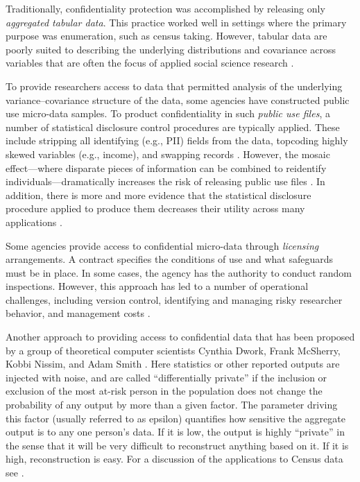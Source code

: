 \documentclass[]{krantz}
\begin{document}
Traditionally, confidentiality protection was accomplished by releasing
only \emph{aggregated tabular data}. This practice worked well in
settings where the primary purpose was enumeration, such as census
taking. However, tabular data are poorly suited to describing the
underlying distributions and covariance across variables that are often
the focus of applied social science research \citep{duncanstatistical}.

To provide researchers access to data that permitted analysis of the
underlying variance--covariance structure of the data, some agencies
have constructed public use micro-data samples. To product
confidentiality in such \emph{public use files}, a number of statistical
disclosure control procedures are typically applied. These include
stripping all identifying (e.g., PII) fields from the data, topcoding
highly skewed variables (e.g., income), and swapping records
\citep{doyle2001confidentiality, zayatz2007disclosure}. However, the
mosaic effect---where disparate pieces of information can be combined to
reidentify individuals---dramatically increases the risk of releasing
public use files \citep{czajka2014minimizing}. In addition, there is
more and more evidence that the statistical disclosure procedure applied
to produce them decreases their utility across many applications
\citep{burkhauser2010improving}.

Some agencies provide access to confidential micro-data through
\emph{licensing} arrangements. A contract specifies the conditions of
use and what safeguards must be in place. In some cases, the agency has
the authority to conduct random inspections. However, this approach has
led to a number of operational challenges, including version control,
identifying and managing risky researcher behavior, and management costs
\citep{doyle2001confidentiality}.

Another approach to providing access to confidential data that has been
proposed by a group of theoretical computer scientists Cynthia Dwork,
Frank McSherry, Kobbi Nissim, and Adam Smith
\citeyearpar{Dworkroth2014}. Here statistics or other reported outputs
are injected with noise, and are called ``differentially private'' if
the inclusion or exclusion of the most at-risk person in the population
does not change the probability of any output by more than a given
factor. The parameter driving this factor (usually referred to as
epsilon) quantifies how sensitive the aggregate output is to any one
person's data. If it is low, the output is highly ``private'' in the
sense that it will be very difficult to reconstruct anything based on
it. If it is high, reconstruction is easy. For a discussion of the
applications to Census data see \citep{ruggles2019, abowed2018}.
\end{document}
